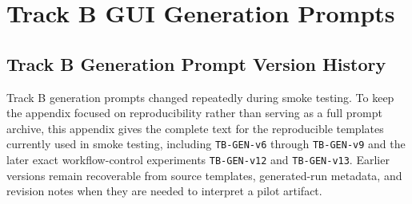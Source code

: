 \section{Track B GUI Generation Prompts}
\label{app:track-b-generation-prompts}

\subsection{Track B Generation Prompt Version History}
\label{app:track-b-generation-version-history}

Track B generation prompts changed repeatedly during smoke testing. To keep
the appendix focused on reproducibility rather than serving as a full prompt
archive, this appendix gives the complete text for the reproducible
templates currently used in smoke testing, including \texttt{TB-GEN-v6} through
\texttt{TB-GEN-v9} and the later exact workflow-control experiments
\texttt{TB-GEN-v12} and \texttt{TB-GEN-v13}. Earlier versions remain recoverable
from source templates, generated-run metadata, and revision notes when they are
needed to interpret a pilot artifact.

